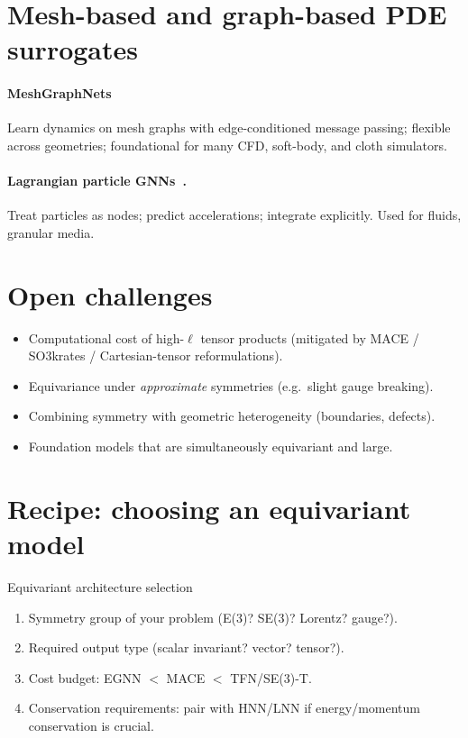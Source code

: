 \section{Mesh-based and graph-based PDE surrogates}
\paragraph{MeshGraphNets~\cite{pfaff2021mgn}}
Learn dynamics on mesh graphs with edge-conditioned message passing;
flexible across geometries; foundational for many CFD, soft-body, and
cloth simulators.
\paragraph{Lagrangian particle GNNs~\cite{sanchez2020graphnet}.}
Treat particles as nodes; predict accelerations; integrate explicitly.
Used for fluids, granular media.

\section{Open challenges}
\begin{itemize}
\item Computational cost of high-$\ell$ tensor products (mitigated by
MACE / SO3krates / Cartesian-tensor reformulations).
\item Equivariance under \emph{approximate} symmetries (e.g.\ slight
gauge breaking).
\item Combining symmetry with geometric heterogeneity (boundaries,
defects).
\item Foundation models that are simultaneously equivariant and large.
\end{itemize}

\section{Recipe: choosing an equivariant model}
\begin{recipe}{Equivariant architecture selection}
\begin{enumerate}
\item Symmetry group of your problem (E(3)? SE(3)? Lorentz? gauge?).
\item Required output type (scalar invariant? vector? tensor?).
\item Cost budget: EGNN $<$ MACE $<$ TFN/SE(3)-T.
\item Conservation requirements: pair with HNN/LNN if energy/momentum
conservation is crucial.
\end{enumerate}
\end{recipe}

